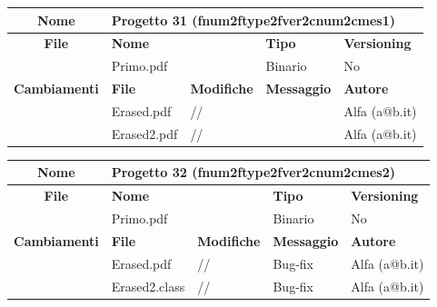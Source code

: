 \begin{table}[ht]
\footnotesize
\begin{tabular}{|c|p{2.5cm}|p{2cm}|p{2.5cm}|p{2.5cm}|}
  \hline
  \textbf{Nome}	& \multicolumn{4}{l|}{Progetto 31 (fnum2ftype2fver2cnum2cmes1)} 									\\
  \hline
  \rowcolor{lightgray}\textbf{File} 		& \multicolumn{2}{l|}{\textbf{Nome}}		& \textbf{Tipo}		& \textbf{Versioning} 		\\
						\cline{2-5}
						& \multicolumn{2}{l|}{Primo.pdf}		& Binario		& No				\\
  \hline
  \rowcolor{lightgray}\textbf{Cambiamenti}	& \textbf{File}		&\textbf{Modifiche}	& \textbf{Messaggio}	& \textbf{Autore}		\\
						\cline{2-5}
						& Erased.pdf		& //	 		& 			& Alfa (a@b.it)			\\
						\cline{2-5}
						& Erased2.pdf		& //	 		& 			& Alfa (a@b.it)			\\
						
  \hline
\end{tabular}
\end{table}

\begin{table}[ht]
\footnotesize
\begin{tabular}{|c|p{2.5cm}|p{2cm}|p{2.5cm}|p{2.5cm}|}
  \hline
  \textbf{Nome}	& \multicolumn{4}{l|}{Progetto 32 (fnum2ftype2fver2cnum2cmes2)} 									\\
  \hline
  \rowcolor{lightgray}\textbf{File} 		& \multicolumn{2}{l|}{\textbf{Nome}}		& \textbf{Tipo}		& \textbf{Versioning} 		\\
						\cline{2-5}
						& \multicolumn{2}{l|}{Primo.pdf}		& Binario		& No				\\
  \hline
  \rowcolor{lightgray}\textbf{Cambiamenti}	& \textbf{File}		&\textbf{Modifiche}	& \textbf{Messaggio}	& \textbf{Autore}		\\
						\cline{2-5}
						& Erased.pdf		& //	 		& Bug-fix		& Alfa (a@b.it)			\\
						\cline{2-5}
						& Erased2.class		& //	 		& Bug-fix		& Alfa (a@b.it)			\\
						
  \hline
\end{tabular}
\end{table}



